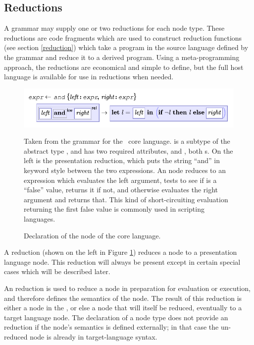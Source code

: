 \subsection{Reductions}
A grammar may supply one or two reductions for each node type. These reductions are code fragments which are used to construct reduction functions (see section \ref{reduction}) which take a program in the source language defined by the grammar and reduce it to a derived program. Using a meta-programming approach, the reductions are economical and simple to define, but the full host language is available for use in reductions when needed.

\begin{figure}[ht]
	\begin{center}
	\includegraphics[scale=0.8]{src/image/and.pdf}
	\end{center}
	
	Taken from the grammar for the \Meta\ core language.  is a subtype of the abstract type , and has two required attributes,  and , both s. On the left is the presentation reduction, which puts the string ``and'' in keyword style between the two expressions. An  node reduces to an expression which evaluates the left argument, tests to see if is a ``false'' value, returns it if not, and otherwise evaluates the right argument and returns that. This kind of short-circuiting evaluation returning the first false value is commonly used in scripting languages\cite{python-and}\cite{clojure-and}\cite{javascript}.
	
	\caption{Declaration of the  node of the core language.}
	\label{fig-and}
\end{figure}

A  reduction (shown on the left in Figure \ref{fig-and}) reduces a node to a presentation language node. This reduction will always be present except in certain special cases which will be described later.

An  reduction is used to reduce a node in preparation for evaluation or execution, and therefore defines the semantics of the node. The result of this reduction is either a node in the , or else a node that will itself be reduced, eventually to a target language node. The declaration of a node type does not provide an  reduction if the node's semantics is defined externally; in that case the un-reduced node is already in target-language syntax.

